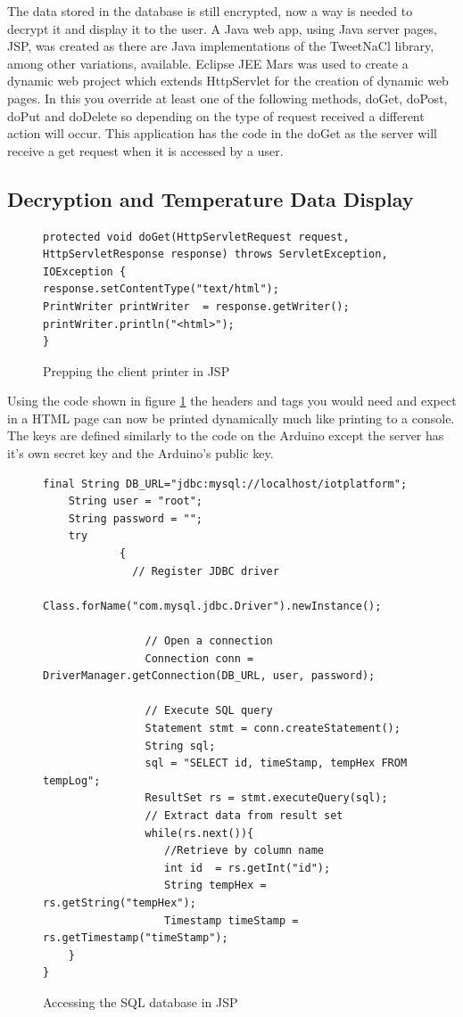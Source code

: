 The data stored in the database is still encrypted, now a way is needed to decrypt it and display it to the user. A Java web app, using Java server pages, JSP, was created as there are Java implementations of the TweetNaCl library, among other variations, available\cite{ian}. Eclipse JEE Mars was used to create a dynamic web project which extends HttpServlet for the creation of dynamic web pages. In this you override at least one of the following methods, doGet, doPost, doPut and doDelete so depending on the type of request received a different action will occur. This application has the code in the doGet as the server will receive a get request when it is accessed by a user.

\subsection{Decryption and Temperature Data Display}

\begin{figure}[H]
\begin{lstlisting}[style=Java]
protected void doGet(HttpServletRequest request, HttpServletResponse response) throws ServletException, IOException {
response.setContentType("text/html");
PrintWriter printWriter  = response.getWriter();
printWriter.println("<html>");
}
\end{lstlisting}
\caption{Prepping the client printer in JSP}
\label{snip:clientprinterjsp}
\end{figure}

Using the code shown in figure \ref{snip:clientprinterjsp} the headers and tags you would need and expect in a HTML page can now be printed dynamically much like printing to a console. The keys are defined similarly to the code on the Arduino except the server has it's own secret key and the Arduino's public key.

\begin{figure}[H]
\begin{lstlisting}[style=Java]
	final String DB_URL="jdbc:mysql://localhost/iotplatform";
	String user = "root"; 
	String password = "";
	try
	        {
	          // Register JDBC driver
	          Class.forName("com.mysql.jdbc.Driver").newInstance();

	            // Open a connection
	            Connection conn = DriverManager.getConnection(DB_URL, user, password);

	            // Execute SQL query
	            Statement stmt = conn.createStatement();
	            String sql;
	            sql = "SELECT id, timeStamp, tempHex FROM tempLog";
	            ResultSet rs = stmt.executeQuery(sql);
	            // Extract data from result set
	            while(rs.next()){
	               //Retrieve by column name
	               int id  = rs.getInt("id");
	               String tempHex = rs.getString("tempHex");
	               Timestamp timeStamp = rs.getTimestamp("timeStamp");
	}
}
\end{lstlisting}
\caption{Accessing the SQL database in JSP}
\label{snip:jspcode}
\end{figure}

